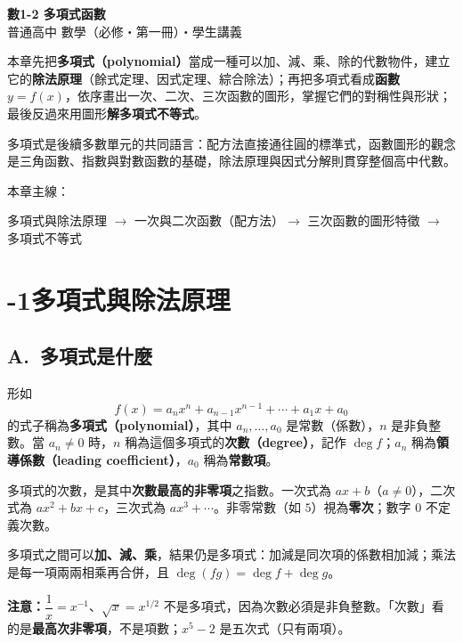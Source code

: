 \documentclass[11pt]{article}
\begin{document}
\begin{center}
{\sffamily\Huge\bfseries 數1-2 多項式函數}\\[3pt]
{\sffamily\large 普通高中 數學（必修・第一冊）・學生講義}
\end{center}
\vspace{0.6em}

本章先把\textbf{多項式（polynomial）}當成一種可以加、減、乘、除的代數物件，建立它的\textbf{除法原理}（餘式定理、因式定理、綜合除法）；再把多項式看成\textbf{函數} $y=f(x)$，依序畫出一次、二次、三次函數的圖形，掌握它們的對稱性與形狀；最後反過來用圖形\textbf{解多項式不等式}。

多項式是後續多數單元的共同語言：配方法直接通往圓的標準式，函數圖形的觀念是三角函數、指數與對數函數的基礎，除法原理與因式分解則貫穿整個高中代數。

\medskip
本章主線：

\begin{center}
多項式與除法原理 $\rightarrow$ 一次與二次函數（配方法）$\rightarrow$ 三次函數的圖形特徵 $\rightarrow$ 多項式不等式
\end{center}

\section*{-1\quad 多項式與除法原理}

\subsection*{\sffamily A.\ 多項式是什麼}

形如
$$f(x)=a_n x^n + a_{n-1}x^{n-1}+\cdots+a_1 x + a_0$$
的式子稱為\textbf{多項式（polynomial）}，其中 $a_n,\dots,a_0$ 是常數（係數），$n$ 是非負整數。當 $a_n\neq 0$ 時，$n$ 稱為這個多項式的\textbf{次數（degree）}，記作 $\deg f$；$a_n$ 稱為\textbf{領導係數（leading coefficient）}，$a_0$ 稱為\textbf{常數項}。

多項式的次數，是其中\textbf{次數最高的非零項}之指數。一次式為 $ax+b$（$a\neq 0$），二次式為 $ax^2+bx+c$，三次式為 $ax^3+\cdots$。非零常數（如 $5$）視為\textbf{零次}；數字 $0$ 不定義次數。

多項式之間可以\textbf{加、減、乘}，結果仍是多項式：加減是同次項的係數相加減；乘法是每一項兩兩相乘再合併，且 $\deg(fg)=\deg f+\deg g$。

\textbf{注意：}$\dfrac{1}{x}=x^{-1}$、$\sqrt{x}=x^{1/2}$ 不是多項式，因為次數必須是非負整數。「次數」看的是\textbf{最高次非零項}，不是項數；$x^5-2$ 是五次式（只有兩項）。
\end{document}
